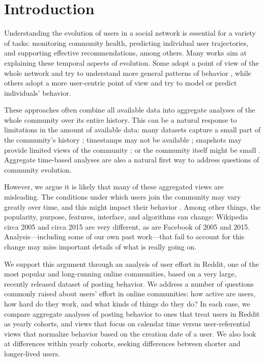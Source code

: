 
\section{Introduction}

Understanding the evolution of users in a social network is essential for a variety of tasks: monitoring community health, predicting individual user trajectories, and supporting effective recommendations, among others.  Many works aim at explaining these temporal aspects of evolution. Some adopt a point of view of the whole network and try to understand more general patterns of behavior \cite{Zhu2014, Kooti2010}, while others adopt a more user-centric point of view and try to model \cite{Correa2010, Priedhorsky2007, Panciera2009, Welser2011} or predict \cite{Danescu-niculescu-mizil2013} individuals' behavior.

These approaches often combine all available data into aggregate analyses of the whole community over its entire history.  This can be a natural response to limitations in the amount of available data: many datasets capture a small part of the community's history \cite{Artzi2012}; timestamps may not be available \cite{Priedhorsky2007, Pujol2010}; snapshots may provide limited views of the community \cite{Cosley2010}; or the community itself might be small \cite{Lewis2008}.  Aggregate time-based analyses are also a natural first way to address questions of community evolution.

However, we argue it is likely that many of these aggregated views are misleading. The conditions under which users join the community may vary greatly over time, and this might impact their behavior \cite{Miller2015}.  Among other things, the popularity, purpose, features, interface, and algorithms can change: Wikipedia circa 2005 and circa 2015 are very different, as are Facebook of 2005 and 2015.  Analysis---including some of our own past work---that fail to account for this change may miss important details of what is really going on.

We support this argument through an analysis of user effort in Reddit, one of the most popular and long-running online communities, based on a very large, recently released dataset of posting behavior.  We address a number of questions commonly raised about users' effort in online communities: how active are users, how hard do they work, and what kinds of things do they do?  In each case, we compare aggregate analyses of posting behavior to ones that treat users in Reddit as yearly cohorts, and views that focus on calendar time versus user-referential views that normalize behavior based on the creation date of a user.  We also look at differences within yearly cohorts, seeking differences between shorter and longer-lived users.

